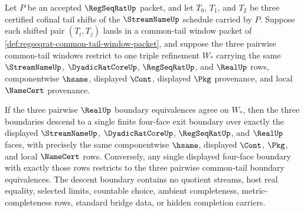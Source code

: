 \begin{theorem}
\label{thm:regseqrat-common-tail-cocycle-descent}
Let $P$ be an accepted $\RegSeqRatUp$ packet, and let $T_0$, $T_1$, and $T_2$ be three certified cofinal tail shifts of the $\StreamNameUp$ schedule carried by $P$. Suppose each shifted pair $(T_i,T_j)$ lands in a common-tail window packet of \autoref{def:regseqrat-common-tail-window-packet}, and suppose the three pairwise common-tail windows restrict to one triple refinement $W_\ast$ carrying the same $\StreamNameUp$, $\DyadicRatCoreUp$, $\RegSeqRatUp$, and $\RealUp$ rows, componentwise $\hsame$, displayed $\Cont$, displayed $\Pkg$ provenance, and local $\NameCert$ provenance.

If the three pairwise $\RealUp$ boundary equivalences agree on $W_\ast$, then the three boundaries descend to a single finite four-face exit boundary over exactly the displayed $\StreamNameUp$, $\DyadicRatCoreUp$, $\RegSeqRatUp$, and $\RealUp$ faces, with precisely the same componentwise $\hsame$, displayed $\Cont$, $\Pkg$, and local $\NameCert$ rows. Conversely, any single displayed four-face boundary with exactly those rows restricts to the three pairwise common-tail boundary equivalences. The descent boundary contains no quotient streams, host real equality, selected limits, countable choice, ambient completeness, metric-completeness rows, standard bridge data, or hidden completion carriers.
\end{theorem}
